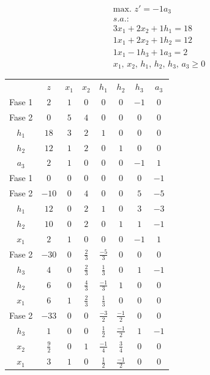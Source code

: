 \begin{equation}
\begin{split}
\mbox{max. } z' = -1a_3\\
s.a.:\\
3x_1+2x_2+1h_1 = 18\\
1x_1+2x_2+1h_2 = 12\\
1x_1-1h_3+1a_3 = 2\\
x_1,\,x_2,\,h_1,\,h_2,\,h_3,\,a_3\geq 0\end{split}
\end{equation}

\begin{center}
\begin{tabular}{c|c|cccccc|}
 & $z$ & $x_1$ & $x_2$ & $h_1$ & $h_2$ & $h_3$ & $a_3$\\ 
Fase 1 & $2$ & $1$ & $0$ & $0$ & $0$ & $-1$ & $0$ \\ 
Fase 2 & $0$ & $5$ & $4$ & $0$ & $0$ & $0$ & $0$ \\ 
\hline
$h_1$ & $18$  & $3$ & $2$ & $1$ & $0$ & $0$ & $0$\\ 
$h_2$ & $12$  & $1$ & $2$ & $0$ & $1$ & $0$ & $0$\\ 
$a_3$ & $2$  & $1$ & $0$ & $0$ & $0$ & $-1$ & $1$\\ 
\hline
Fase 1 & $0$ & $0$ & $0$ & $0$ & $0$ & $0$ & $-1$ \\ 
Fase 2 & $-10$ & $0$ & $4$ & $0$ & $0$ & $5$ & $-5$ \\ 
\hline
$h_1$ & $12$  & $0$ & $2$ & $1$ & $0$ & $3$ & $-3$\\ 
$h_2$ & $10$  & $0$ & $2$ & $0$ & $1$ & $1$ & $-1$\\ 
$x_1$ & $2$  & $1$ & $0$ & $0$ & $0$ & $-1$ & $1$\\ 
\hline
Fase 2 & $-30$ & $0$ & $\frac{2}{3}$ & $\frac{-5}{3}$ & $0$ & $0$ & $0$ \\ 
\hline
$h_3$ & $4$  & $0$ & $\frac{2}{3}$ & $\frac{1}{3}$ & $0$ & $1$ & $-1$\\ 
$h_2$ & $6$  & $0$ & $\frac{4}{3}$ & $\frac{-1}{3}$ & $1$ & $0$ & $0$\\ 
$x_1$ & $6$  & $1$ & $\frac{2}{3}$ & $\frac{1}{3}$ & $0$ & $0$ & $0$\\ 
\hline
Fase 2 & $-33$ & $0$ & $0$ & $\frac{-3}{2}$ & $\frac{-1}{2}$ & $0$ & $0$ \\ 
\hline
$h_3$ & $1$  & $0$ & $0$ & $\frac{1}{2}$ & $\frac{-1}{2}$ & $1$ & $-1$\\ 
$x_2$ & $\frac{9}{2}$  & $0$ & $1$ & $\frac{-1}{4}$ & $\frac{3}{4}$ & $0$ & $0$\\ 
$x_1$ & $3$  & $1$ & $0$ & $\frac{1}{2}$ & $\frac{-1}{2}$ & $0$ & $0$\\ 
\hline
\end{tabular}
\end{center}

